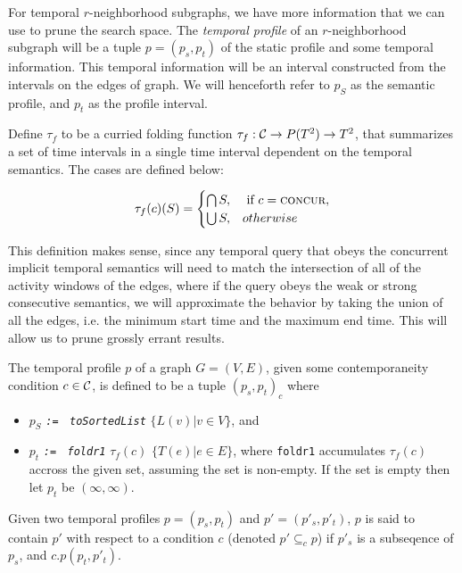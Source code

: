 For temporal $r$-neighborhood subgraphs, we have more information that we can
use to prune the search space. The \textit{temporal profile} of an
$r$-neighborhood subgraph will be a tuple $p = (p_s,p_t)$ of the static profile and
some temporal information. This temporal information will be an interval
constructed from the intervals on the edges of graph. We will henceforth refer
to $p_S$ as the semantic profile, and $p_t$ as the profile interval.

\begin{defn}
  Define $\tau_f$ to be a curried folding function $\tau_f : \mathcal{C} \to P(T^2) \to T^2$,
  that summarizes a set of time intervals in a single time interval dependent on
  the temporal semantics. The cases are defined below:

  \[
    \tau_f(c)(S) = \begin{cases}
      \bigcap S, & \text{ if } c = \textsc{concur}, \\
      \bigcup S, & otherwise      
    \end{cases}
  \]
  
\end{defn}

This definition makes sense, since any temporal query that obeys the
concurrent implicit temporal semantics will need to match the intersection of
all of the activity windows of the edges, where if the query obeys the weak or
strong consecutive semantics, we will approximate the behavior by taking the
union of all the edges, i.e. the minimum start time and the maximum end
time. This will allow us to prune grossly errant results.

\begin{defn}
  The temporal profile $p$ of a graph $G = (V,E)$, given some contemporaneity condition
  $c \in \mathcal{C}$, is defined to be a tuple $(p_s, p_t)_c$ where
  \begin{itemize}
  \item $p_S$ \emph{\texttt{:=} \, \texttt{toSortedList}} \; $\{L(v) | v \in V \}$,
    and
  \item $p_t$ \emph{\texttt{:=} \, \texttt{foldr1}} \; $\tau_f(c)$ \; $\{T(e) | e \in E\}$, where
    \texttt{foldr1} accumulates $\tau_f(c)$ accross the  given set, assuming the set
    is non-empty. If the set is empty then let $p_t$ be $(\infty,\infty)$.
  \end{itemize}

  Given two temporal profiles $p = (p_s, p_t)$ and $p' = (p'_s, p'_t)$, $p$ is
  said to contain $p'$ with respect to a condition $c$ (denoted $p' \subseteq_c
  p$) if $p'_s$ is a subseqence of $p_s$, and $c.p(p_t, p'_t)$.
\end{defn}


